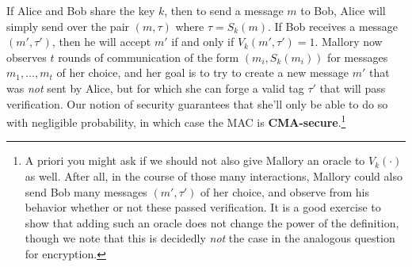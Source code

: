 If Alice and Bob share the key \(k\), then to send a message \(m\) to
Bob, Alice will simply send over the pair \((m,\tau)\) where
\(\tau = S_k(m)\). If Bob receives a message \((m',\tau')\), then he
will accept \(m'\) if and only if \(V_k(m',\tau')=1\). Mallory now
observes \(t\) rounds of communication of the form \((m_i,S_k(m_i))\)
for messages \(m_1,\ldots,m_t\) of her choice, and her goal is to try to
create a new message \(m'\) that was \emph{not} sent by Alice, but for
which she can forge a valid tag \(\tau'\) that will pass verification.
Our notion of security guarantees that she'll only be able to do so with
negligible probability, in which case the MAC is
\textbf{CMA-secure}.\footnote{A priori you might ask if we should not
  also give Mallory an oracle to \(V_k(\cdot)\) as well. After all, in
  the course of those many interactions, Mallory could also send Bob
  many messages \((m',\tau')\) of her choice, and observe from his
  behavior whether or not these passed verification. It is a good
  exercise to show that adding such an oracle does not change the power
  of the definition, though we note that this is decidedly \emph{not}
  the case in the analogous question for encryption.}

\hypertarget{choosemessages}{}

